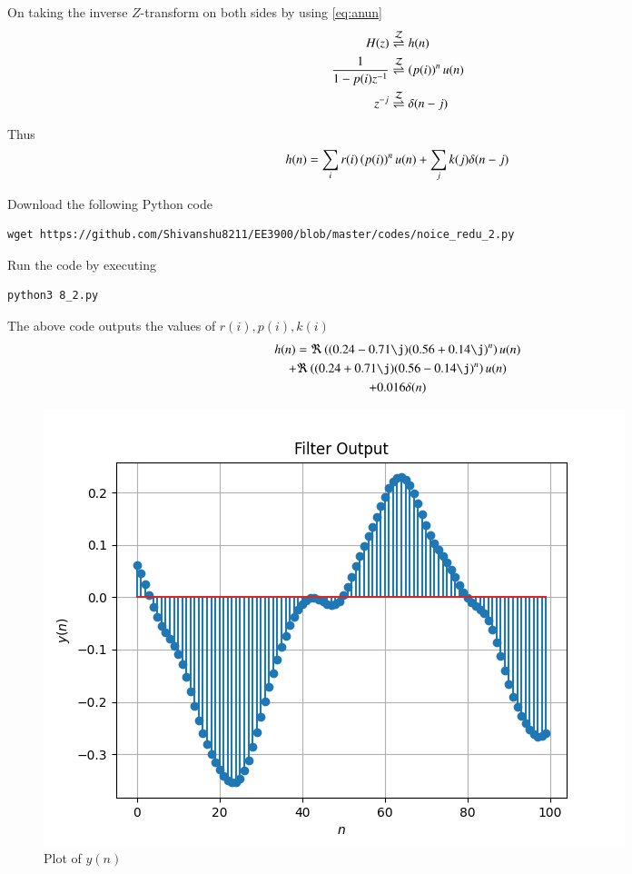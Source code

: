 \documentclass[journal,12pt,twocolumn]{IEEEtran}
\renewcommand\thesection{\arabic{section}}
\begin{document}
\begin{enumerate}[label=\thesection.\arabic*]
               On taking the inverse $Z$-transform on both sides by using \eqref{eq:anun}
               \begin{align}
                    H(z)                   & \overset{\mathcal{Z}}{ \rightleftharpoons} h(n)              \\
                    \frac{1}{1-p(i)z^{-1}} & \overset{\mathcal{Z}}{ \rightleftharpoons} \left(p(i)\right)^nu(n) \\
                    z^{-j}                 & \overset{\mathcal{Z}}{ \rightleftharpoons} \delta(n-j)
               \end{align}

               Thus
               \begin{align}
                    h(n) = \sum_i r(i)\left(p(i)\right)^nu(n) + \sum_j k(j)\delta(n-j)
               \end{align}

               Download the following Python code
               \begin{lstlisting}
wget https://github.com/Shivanshu8211/EE3900/blob/master/codes/noice_redu_2.py
                    \end{lstlisting}

               Run the code by executing
               \begin{lstlisting}
python3 8_2.py
               \end{lstlisting}

               The above code outputs the values of $r(i), p(i), k(i)$
               \begin{multline}
                    h(n) =
                    \Re\brak{(0.24 - 0.71\j)(0.56 + 0.14\j)^n} u(n) \\
                    + \Re\brak{(0.24 + 0.71\j)(0.56 - 0.14\j)^n} u(n) \\
                    + 0.016\delta(n)
               \end{multline}

               \begin{figure}[!ht]
                    \centering
                    \includegraphics[width=\columnwidth]{./figs/8_2_1.png}
                    \caption{Plot of $y(n)$}
                    \label{fig-8.2.1}
               \end{figure}


\end{enumerate}
\end{document}
